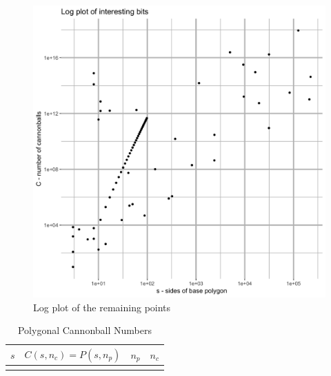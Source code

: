 \begin{figure}[H]
\centering
\includegraphics[width=\textwidth]{../graph/interesting_log.png}
\caption{Log plot of the remaining points}
\label{fig_log_interesting}
\end{figure}

\begin{longtable}{*4r}
\toprule
\boldmath \(s\) & \boldmath \(C(s, n_c) = P(s, n_p)\)
& \boldmath \(n_p\) & \boldmath \(n_c\) \\
\midrule
\endhead

\bottomrule
\caption{Polygonal Cannonball Numbers}
\label{tab_ugly}
\end{longtable}

